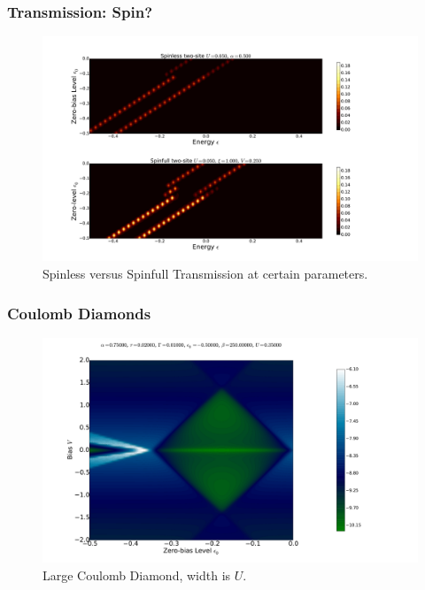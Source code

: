 \begin{frame}
    \frametitle{Transmission: Spin?}
    \vspace{-3mm}
    \begin{figure}[!b] 
        \centering
        \includegraphics[height=.85\textheight, width=\textwidth,clip=true, trim=0cm 0cm 5cm 2cm]{res/transmap_u1_k2.pdf}
        \vspace{-6mm}
        \caption{Spinless versus Spinfull Transmission at certain parameters.}
    \end{figure} 
\end{frame}
\begin{frame}
    \frametitle{Coulomb Diamonds}
    \vspace{-3mm}
    \begin{figure}[!b] 
        \centering
        \includegraphics[height=.85\textheight, width=\textwidth]{res/current_map_diamond_alpha_075.pdf}
        \vspace{-6mm}
        \caption{Large Coulomb Diamond, width is $U$.}
    \end{figure} 
\end{frame}
